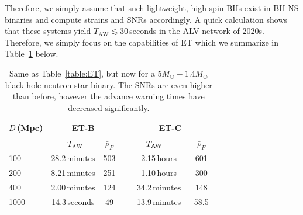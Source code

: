 \documentclass[prd,amsmath,amssymb,aps,floats,amsfonts,notitlepage,superscriptaddress,eqsecnum,nofootinbib,10pt]{revtex4-1}
\newcommand\T{\rule{0pt}{2.6ex}}       %
\newcommand\B{\rule[-1.2ex]{0pt}{0pt}} %
\begin{document}
Therefore, we simply assume that such lightweight, high-spin BHs exist in BH-NS binaries and compute strains and SNRs accordingly.
A quick calculation shows that these systems yield $T_\text{AW} \lesssim 30\,$seconds in the ALV network of 2020s. %
Therefore, we simply focus on the capabilities of ET which we summarize in Table~\ref{table:ET_BH_NS} below.
%
%
%
\begin{table}[h]
\centering
\begin{tabular}{l|ccccc}
\hline
$D\,$(Mpc) & \multicolumn{2}{c}{ET-B} &  & \multicolumn{2}{c}{ET-C}\T\B\\
\hline
{}&  \ \hspace{6mm}$T_\text{AW}$ \hspace{8mm} & $\bar{\rho}_{F}$ &{}  & $\hspace{6mm}T_\text{AW} \hspace{10mm}$ & $\bar{\rho}_{F}$\T\B\\

100 &   28.2\,minutes & 503 &{\qquad} &  2.15\,hours & 601\T\\
200 & 8.21\,minutes & 251  &{\qquad} & 1.10\,hours & 300 \\
400 &  2.00\,minutes & 124 &{\qquad} & 34.2\,minutes & 148\\
1000 & 14.3\,seconds & 49 &{\qquad} & 13.9\,minutes& 58.5\\
\hline
\end{tabular}
\caption{Same as Table~\ref{table:ET}, but now for a $5 M_\odot- 1.4 M_\odot$ black hole-neutron star binary.
The SNRs are even higher than before, however the advance warning times have decreased significantly.}\label{table:ET_BH_NS}
\end{table}
%
%
\end{document}
